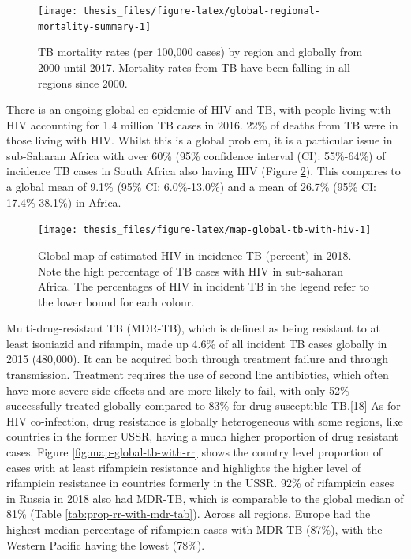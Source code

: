 \documentclass[11pt,twoside]{bristolthesis}
\begin{document}
  \begin{figure}
  
  {\centering \texttt{[image: thesis\_files/figure-latex/global-regional-mortality-summary-1]} 
  
  }
  
  \caption[TB mortality rates (per 100,000 cases) by region and globally from 2000 until 2017.]{TB mortality rates (per 100,000 cases) by region and globally from 2000 until 2017. Mortality rates from TB have been falling in all regions since 2000.}\label{fig:global-regional-mortality-summary}
  \end{figure}
  There is an ongoing global co-epidemic of HIV and TB, with people living with HIV accounting for 1.4 million TB cases in 2016. 22\% of deaths from TB were in those living with HIV. Whilst this is a global problem, it is a particular issue in sub-Saharan Africa with over 60\% (95\% confidence interval (CI): 55\%-64\%) of incidence TB cases in South Africa also having HIV (Figure \ref{fig:map-global-tb-with-hiv}). This compares to a global mean of 9.1\% (95\% CI: 6.0\%-13.0\%) and a mean of 26.7\% (95\% CI: 17.4\%-38.1\%) in Africa.
  \begin{figure}
  
  {\centering \texttt{[image: thesis\_files/figure-latex/map-global-tb-with-hiv-1]} 
  
  }
  
  \caption[Global map of estimated HIV in incidence TB (percent) in 2018.]{Global map of estimated HIV in incidence TB (percent) in 2018. Note the high percentage of TB cases with HIV in sub-saharan Africa. The percentages of HIV in incident TB in the legend refer to the lower bound for each colour.}\label{fig:map-global-tb-with-hiv}
  \end{figure}
  Multi-drug-resistant TB (MDR-TB), which is defined as being resistant to at least isoniazid and rifampin, made up 4.6\% of all incident TB cases globally in 2015 (480,000). It can be acquired both through treatment failure and through transmission. Treatment requires the use of second line antibiotics, which often have more severe side effects and are more likely to fail, with only 52\% successfully treated globally compared to 83\% for drug susceptible TB.{[}\protect\hyperlink{ref-WHOTB2016}{18}{]} As for HIV co-infection, drug resistance is globally heterogeneous with some regions, like countries in the former USSR, having a much higher proportion of drug resistant cases. Figure \ref{fig:map-global-tb-with-rr} shows the country level proportion of cases with at least rifampicin resistance and highlights the higher level of rifampicin resistance in countries formerly in the USSR. 92\% of rifampicin cases in Russia in 2018 also had MDR-TB, which is comparable to the global median of 81\% (Table \ref{tab:prop-rr-with-mdr-tab}). Across all regions, Europe had the highest median percentage of rifampicin cases with MDR-TB (87\%), with the Western Pacific having the lowest (78\%).
\end{document}
